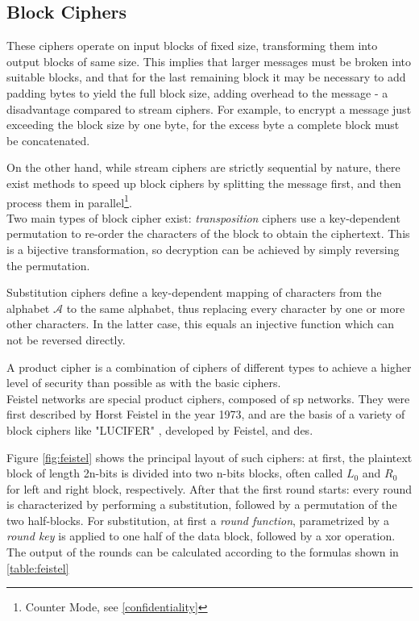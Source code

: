\subsection{Block Ciphers}

These ciphers operate on input blocks of fixed size, transforming them into output blocks of same size. This implies that larger messages must be broken into
suitable blocks, and that for the last remaining block it may be necessary to add padding bytes to yield the full block size,
adding overhead to the message - a disadvantage compared to stream ciphers. For example, to encrypt a message just exceeding the block size by one byte,
for the excess byte a complete block must be concatenated. 

On the other hand, while stream ciphers are strictly sequential by nature, there exist methods to speed up block ciphers by splitting the message
first, and then process them in parallel\footnote{Counter Mode, see \ref{confidentiality}}. 
\\
Two main types of block cipher exist: \textit{transposition} ciphers use a key-dependent permutation to re-order the characters of the block to obtain the ciphertext.
This is a bijective transformation, so decryption can be achieved by simply reversing the permutation.

Substitution ciphers define a key-dependent mapping of characters from the alphabet $\mathcal{A}$ to the same alphabet, thus replacing every character by one
or more other characters. In the latter case, this equals an injective function which can not be reversed directly.
 
A product cipher is a combination of ciphers of different types to achieve a higher level of security than possible as with the basic ciphers. 
\\

Feistel networks are special product ciphers, composed of \gls{sp} networks. They were first described by Horst Feistel in the year 1973\cite{feistel}, and are 
the basis of a variety of block ciphers like "LUCIFER" \cite{feistel1974block,}, developed by Feistel, and \gls{des}.

Figure \ref{fig:feistel} shows the principal layout of such ciphers: at first, the plaintext block of length
2n-bits is divided into two n-bits blocks, often called $L_0$ and $R_0$ for left and right block, respectively. After that the first round starts: every round
is characterized by performing a substitution, followed by a permutation of the two half-blocks. For substitution, at first a \textit{round function},
parametrized by a \textit{round key} is applied to one half of the data block, followed by a \gls{xor} operation. The output of the rounds can be calculated
according to the formulas shown in \ref{table:feistel}
\\

